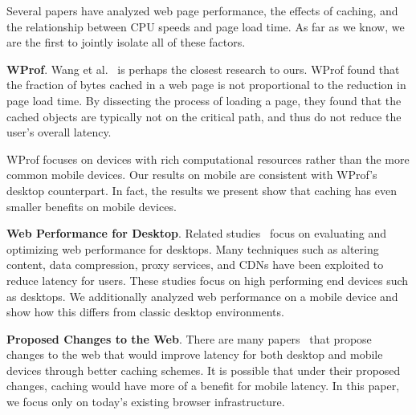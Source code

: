 
Several papers have analyzed web page performance, the effects of caching, and the relationship between CPU speeds and page load time.
As far as we know, we are the first to jointly isolate all of these factors. %

\textbf{WProf}. Wang et al.~\cite{wang2013demystifying} is perhaps the closest research to ours. WProf found that the fraction of bytes cached in a web page is not proportional to the reduction in page load time. By dissecting the process of loading a page, they found that the cached objects are typically not on the critical path, and thus do not reduce the user's overall latency. 

WProf focuses on devices with rich computational resources rather than the more common mobile devices. Our results on mobile are consistent with WProf's desktop counterpart. In fact, the results we present show that caching has even smaller benefits on mobile devices.

\textbf{Web Performance for Desktop}. Related studies~\cite{web-perf-2, web-perf-3} focus on evaluating and optimizing web performance for desktops. Many techniques such as altering content, data compression, proxy services, and CDNs have been exploited to reduce latency for users. These studies focus on high performing end devices such as desktops. We additionally analyzed web performance on a mobile device and show how this differs from classic desktop environments.

\textbf{Proposed Changes to the Web}. There are many papers~\cite{web-perf-4-new-design, web-caching-4-new-design, web-caching-5-new-design, web-caching-latency-1-new-design, web-caching-latency-2-new-design, web-caching-latency-3-new-design, web-caching-latency-5-new-design, web-caching-latency-6-new-design, web-caching-latency-7-new-design} that propose changes to the web that would improve latency for both desktop and mobile devices through better caching schemes. It is possible that under their proposed changes, caching would have more of a benefit for mobile latency. In this paper, we focus only on today's existing browser infrastructure. %

